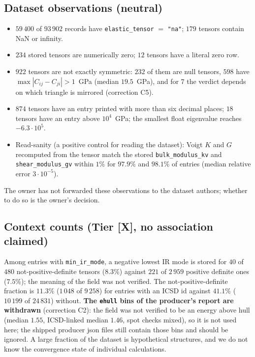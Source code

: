 \documentclass[10pt]{article}
\newcommand{\tier}[1]{\textsf{[#1]}}
\newcommand{\tX}{\tier{X}}
\begin{document}
\subsection{Dataset observations (neutral)}\label{sec:obs}
\begin{itemize}\itemsep=1pt
\item $59\,400$ of $93\,902$ records have \texttt{elastic\_tensor} $=$ \texttt{"na"}; $179$ tensors contain NaN or infinity.
\item $234$ stored tensors are numerically zero; $12$ tensors have a literal zero row.
\item $922$ tensors are not exactly symmetric: $232$ of them are null tensors, $598$ have $\max|C_{ij}-C_{ji}|>1$~GPa (median $19.5$~GPa), and for $7$ the verdict depends on which triangle is mirrored (correction C5).
\item $874$ tensors have an entry printed with more than six decimal places; $18$ tensors have an entry above $10^4$~GPa; the smallest float eigenvalue reaches $-6.3\cdot10^5$.
\item Read-sanity (a positive control for reading the dataset): Voigt $K$ and $G$ recomputed from the tensor match the stored \texttt{bulk\_modulus\_kv} and \texttt{shear\_modulus\_gv} within $1\%$ for $97.9\%$ and $98.1\%$ of entries (median relative error $3\cdot10^{-5}$).
\end{itemize}
The owner has not forwarded these observations to the dataset authors; whether to do so is the owner's decision.

\subsection{Context counts (Tier \tX, no association claimed)}
Among entries with \texttt{min\_ir\_mode}, a negative lowest IR mode is stored for $40$ of $480$ not-positive-definite tensors ($8.3\%$) against $221$ of $2\,959$ positive definite ones ($7.5\%$); the meaning of the field was not verified. The not-positive-definite fraction is $11.3\%$ ($1\,048$ of $9\,258$) for entries with an ICSD id against $41.1\%$ ($10\,199$ of $24\,831$) without. \textbf{The \texttt{ehull} bins of the producer's report are withdrawn} (correction C2): the field was not verified to be an energy above hull (median $1.55$, ICSD-linked median $1.46$, spot checks mixed), so it is not used here; the shipped producer json files still contain those bins and should be ignored. A large fraction of the dataset is hypothetical structures, and we do not know the convergence state of individual calculations.
\end{document}
